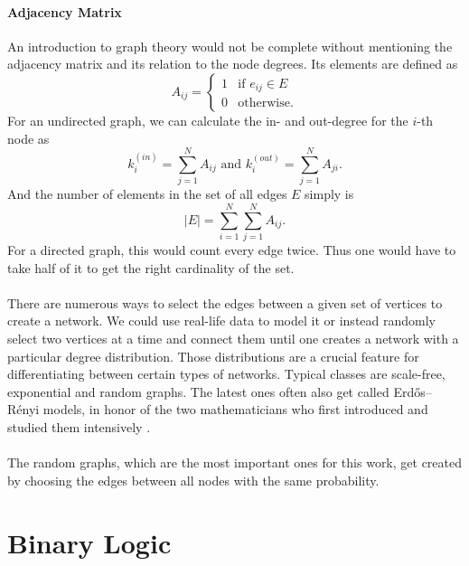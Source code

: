 \paragraph*{Adjacency Matrix}
An introduction to graph theory would not be complete without mentioning the adjacency matrix and its relation to the node degrees. Its elements are defined as
\begin{equation}\label{eq:adjacency_matrix}
A_{ij} =\begin{cases}
1 & \text{if $e_{ij} \in E$}\\
0 & \text{otherwise}.
\end{cases}
\end{equation}
For an undirected graph, we can calculate the in- and out-degree for the $i$-th node as
\begin{equation}
k^{(in)}_i = \sum\limits_{j = 1}^{N} A_{ij} \text{ and } k^{(out)}_i = \sum\limits_{j = 1}^{N} A_{ji}.
\end{equation}
And the number of elements in the set of all edges $ E $ simply is
\begin{equation}
|E| = \sum\limits_{i = 1}^{N} \sum\limits_{j = 1}^{N} A_{ij}.
\end{equation}
For a directed graph, this would count every edge twice. Thus one would have to take half of it to get the right cardinality of the set.


\paragraph*{}
There are numerous ways to select the edges between a given set of vertices to create a network. We could use real-life data to model it or instead randomly select two vertices at a time and connect them until one creates a network with a particular degree distribution. Those distributions are a crucial feature for differentiating between certain types of networks. Typical classes are scale-free, exponential and random graphs. The latest ones often also get called Erd\H{o}s–Rényi models, in honor of the two mathematicians who first introduced and studied them intensively \cite{erdHos1960evolution}.

\paragraph*{}
The random graphs, which are the most important ones for this work, get created by choosing the edges between all nodes with the same probability.
\section{Binary Logic}

